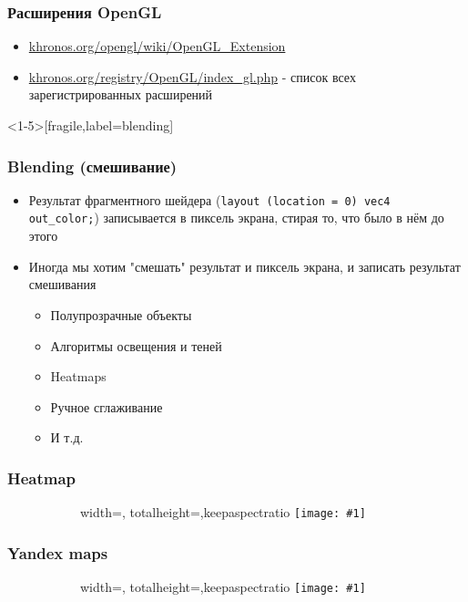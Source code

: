\documentclass{beamer}
\newcommand{\slideimage}[1]{
  \begin{figure}
    \begin{adjustbox}{width=\textwidth, totalheight=\textheight-2\baselineskip-2\baselineskip,keepaspectratio}
      \texttt{[image: \#1]}
    \end{adjustbox}
  \end{figure}
}
\begin{document}
\begin{frame}[fragile]
\frametitle{Расширения OpenGL}
\begin{itemize}
\item \href{https://www.khronos.org/opengl/wiki/OpenGL_Extension}{khronos.org/opengl/wiki/OpenGL\_Extension}
\item \href{https://www.khronos.org/registry/OpenGL/index_gl.php}{khronos.org/registry/OpenGL/index\_gl.php} - список всех зарегистрированных расширений
\end{itemize}
\end{frame}

\begin{frame}<1-5>[fragile,label=blending]
\frametitle{Blending (смешивание)}
\begin{itemize}
\item Результат фрагментного шейдера (\verb|layout (location = 0) vec4 out_color;|) записывается в пиксель экрана, стирая то, что было в нём до этого
\pause
\item Иногда мы хотим "смешать" результат и пиксель экрана, и записать результат смешивания
\pause
\begin{itemize}
\item Полупрозрачные объекты
\pause
\item Алгоритмы освещения и теней
\pause
\item Heatmaps
\pause
\item Ручное сглаживание
\pause
\item И т.д.
\end{itemize}
\end{itemize}
\end{frame}

\begin{frame}
\frametitle{Heatmap}
\begin{figure}
\slideimage{heatmap.jpg}
\end{figure}
\end{frame}


\begin{frame}
\frametitle{Yandex maps}
\begin{figure}
\slideimage{yandex-maps.jpg}
\end{figure}
\end{frame}

\end{document}
